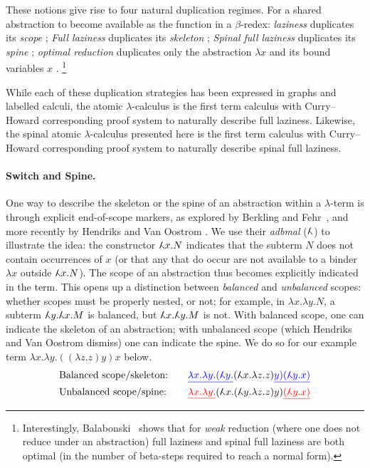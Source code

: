 \documentclass[runningheads]{llncs}
\newcommand\adbmal{\reflectbox{$\lambda$}}
\newcommand\red{\color{red}}
\newcommand\blue{\color{blue}}
\begin{document}
These notions give rise to four natural duplication regimes. For a shared abstraction to become available as the function in a $\beta$-redex: \emph{laziness} duplicates its \emph{scope} \cite{Launchbury-1993}; \emph{Full laziness} duplicates its \emph{skeleton} \cite{Wadsworth-1971}; \emph{Spinal full laziness} duplicates its \emph{spine} \cite{blanc2005sharing}; \emph{optimal reduction} duplicates only the abstraction $\lambda x$ and its bound variables $x$ \cite{Lamping-1990,Asperti-Guerrini-1998}.%
\footnote{Interestingly, Balabonski~\cite{balabonski13} shows that for \emph{weak} reduction (where one does not reduce under an abstraction) full laziness and spinal full laziness are both optimal (in the number of beta-steps required to reach a normal form).}

While each of these duplication strategies has been expressed in graphs and labelled calculi, the atomic $\lambda$-calculus is the first term calculus with Curry--Howard corresponding proof system to naturally describe full laziness. Likewise, the spinal atomic $\lambda$-calculus presented here is the first term calculus with Curry--Howard corresponding proof system to naturally describe spinal full laziness.

\paragraph*{Switch and Spine.}
%
One way to describe the skeleton or the spine of an abstraction within a $\lambda$-term is through explicit end-of-scope markers, as explored by Berkling and Fehr~\cite{Berkling-Fehr-1982}, and more recently by Hendriks and Van Oostrom \cite{Hendriks-VanOostrom-2003}. We use their \emph{adbmal} ($\adbmal$) to illustrate the idea: the constructor $\adbmal x.N$ indicates that the subterm $N$ does not contain occurrences of $x$ (or that any that do occur are not available to a binder $\lambda x$ outside $\adbmal x.N$). The scope of an abstraction thus becomes explicitly indicated in the term. This opens up a distinction between \emph{balanced} and \emph{unbalanced} scopes: whether scopes must be properly nested, or not; for example, in $\lambda x.\lambda y.N$, a subterm $\adbmal y.\adbmal x.M$ is balanced, but $\adbmal x.\adbmal y.M$ is not. With balanced scope, one can indicate the skeleton of an abstraction; with unbalanced scope (which Hendriks and Van Oostrom dismiss) one can indicate the spine. We do so for our example term $\lambda x.\lambda y.((\lambda z.z)y)x$ below. 
%
\[
\begin{array}{l@{\qquad}l}
		\text{Balanced scope/skeleton:}   & {\blue\underline{\lambda x.\lambda y.(\adbmal y.}}(\adbmal x.\lambda z.z){\blue\underline{y)(\adbmal y.x)}} 
\\[5pt]	\text{Unbalanced scope/spine:} &  {\red\underline{\lambda x.\lambda y.}}(\adbmal x.(\adbmal y.\lambda z.z)y){\red\underline{(\adbmal y.x)}}
\end{array}
\]
\end{document}

